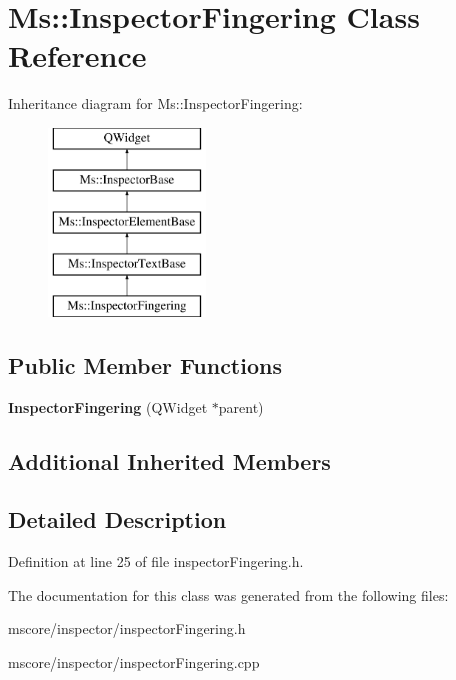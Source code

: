 \hypertarget{class_ms_1_1_inspector_fingering}{}\section{Ms\+:\+:Inspector\+Fingering Class Reference}
\label{class_ms_1_1_inspector_fingering}
Inheritance diagram for Ms\+:\+:Inspector\+Fingering\+:\begin{figure}[H]
\begin{center}
\leavevmode
\includegraphics[height=5.000000cm]{class_ms_1_1_inspector_fingering}
\end{center}
\end{figure}
\subsection*{Public Member Functions}
\begin{DoxyCompactItemize}
\item 
\mbox{\label{class_ms_1_1_inspector_fingering_a5006fec8b092bec2bb7f71a07de994da}} 
{\bfseries Inspector\+Fingering} (Q\+Widget $\ast$parent)
\end{DoxyCompactItemize}
\subsection*{Additional Inherited Members}


\subsection{Detailed Description}


Definition at line 25 of file inspector\+Fingering.\+h.



The documentation for this class was generated from the following files\+:\begin{DoxyCompactItemize}
\item 
mscore/inspector/inspector\+Fingering.\+h\item 
mscore/inspector/inspector\+Fingering.\+cpp\end{DoxyCompactItemize}
